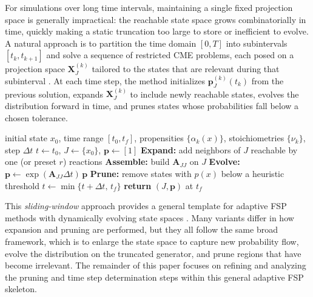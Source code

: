\documentclass[onefignum,onetabnum]{siamart171218}
\begin{document}
For simulations over long time intervals, maintaining a single fixed projection space is generally impractical: the reachable state space grows combinatorially in time, quickly making a static truncation too large to store or inefficient to evolve. A natural approach is to partition the time domain $[0,T]$ into subintervals $[t_k,t_{k+1}]$ and solve a sequence of restricted CME problems, each posed on a projection space $\mathbf{X}_J^{(k)}$ tailored to the states that are relevant during that subinterval \cite{Wolf2010, Dinh_2020}.  
At each time step, the method initializes $\boldsymbol{p}_J^{(k)}(t_k)$ from the previous solution, expands $\mathbf{X}_J^{(k)}$ to include newly reachable states, evolves the distribution forward in time, and prunes states whose probabilities fall below a chosen tolerance.

\begin{algorithm}[H]
\caption{FSP with Time Stepping and State Space Control}
\label{alg:fsp-naive}
\begin{algorithmic}[1]
\REQUIRE initial state $x_0$, time range $[t_0,t_f]$, propensities $\{\alpha_k(x)\}$, stoichiometries $\{\nu_k\}$, step $\Delta t$
\STATE $t \gets t_0$, \; $J \gets \{x_0\}$, \; $\boldsymbol{p} \gets [1]$
  \STATE \textbf{Expand:} add neighbors of $J$ reachable by one (or preset $r$) reactions
  \STATE \textbf{Assemble:} build $\mathbf{A}_{JJ}$ on $J$
  \STATE \textbf{Evolve:} $\boldsymbol{p} \gets \exp(\mathbf{A}_{JJ}\Delta t)\,\boldsymbol{p}$
  \STATE \textbf{Prune:} remove states with $p(x)$ below a heuristic threshold
  \STATE $t \gets \min\{t+\Delta t,\,t_f\}$
\ENDWHILE
\STATE \textbf{return} $(J,\boldsymbol{p})$ at $t_f$
\end{algorithmic}
\end{algorithm}

This \emph{sliding-window} approach provides a general template for adaptive FSP methods with dynamically evolving state spaces \cite{Dinh2016}. Many variants differ in how expansion and pruning are performed, but they all follow the same broad framework, which is to enlarge the state space to capture new probability flow, evolve the distribution on the truncated generator, and prune regions that have become irrelevant. 
The remainder of this paper focuses on refining and analyzing the pruning and time step determination steps within this general adaptive FSP skeleton.
\end{document}
